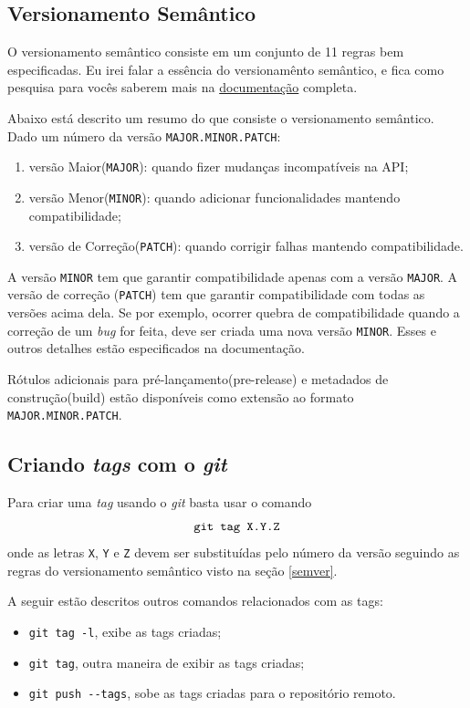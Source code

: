 \documentclass[12pt,openright,oneside,a4paper,english,brazil]{abntex2}
\begin{document}
\subsection{Versionamento Semântico \label{semver}}

O versionamento semântico consiste em um conjunto de 11 regras bem especificadas. Eu irei falar a essência do versionamênto semântico, e fica como pesquisa para vocês saberem mais na \hyperref{http://semver.org/lang/pt-BR/}{}{}{documentação} completa.

Abaixo está descrito um resumo do que consiste o versionamento semântico. Dado um número da versão \texttt{MAJOR.MINOR.PATCH}:

\begin{enumerate}
	\item versão Maior(\texttt{MAJOR}): quando fizer mudanças incompatíveis na API;
	\item versão Menor(\texttt{MINOR}): quando adicionar funcionalidades mantendo compatibilidade;
	\item versão de Correção(\texttt{PATCH}): quando corrigir falhas mantendo compatibilidade.
\end{enumerate}

A versão \texttt{MINOR} tem que garantir compatibilidade apenas com a versão \texttt{MAJOR}. A versão de correção (\texttt{PATCH}) tem que garantir compatibilidade com todas as versões acima dela. Se por exemplo, ocorrer quebra de compatibilidade quando a correção de um \textit{bug} for feita, deve ser criada uma nova versão \texttt{MINOR}. Esses e outros detalhes estão especificados na documentação.


Rótulos adicionais para pré-lançamento(pre-release) e metadados de construção(build) estão disponíveis como extensão ao formato \texttt{MAJOR.MINOR.PATCH}.

\subsection{Criando \textit{tags} com o \textit{git}}

Para criar uma \textit{tag} usando o \textit{git} basta usar o comando $$\verb|git tag X.Y.Z|$$ onde as letras \texttt{X}, \texttt{Y} e \texttt{Z} devem ser substituídas pelo número da versão seguindo as regras do versionamento semântico visto na seção \ref{semver}.

A seguir estão descritos outros comandos relacionados com as tags:

\begin{itemize}
	\item \verb|git tag -l|, exibe as tags criadas;
	\item \verb|git tag|, outra maneira de exibir as tags criadas;
	\item \verb|git push --tags|, sobe as tags criadas para o repositório remoto.
\end{itemize}
\end{document}
